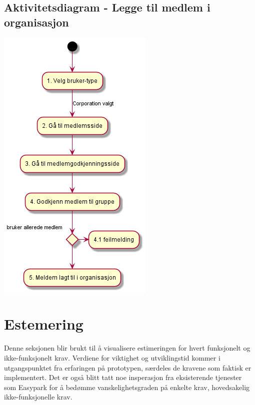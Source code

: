 \documentclass[12pt]{article}
\begin{document}
    \subsection{Aktivitetsdiagram - Legge til medlem i organisasjon}
    \includegraphics[max width=\textwidth]{bilder/diagrammer/aktivitet_medlem.png}

\section{Estemering}
Denne seksjonen blir brukt til å visualisere estimeringen for hvert funksjonelt og ikke-funksjonelt krav. Verdiene for viktighet og utviklingstid kommer i utgangspunktet fra erfaringen på prototypen, særdeles de kravene som faktisk er implementert. Det er også blitt tatt noe insperasjon fra eksisterende tjenester som Easypark for å bedømme vanskelighetsgraden på enkelte krav, hovedsakelig ikke-funksjonelle krav.
\end{document}
